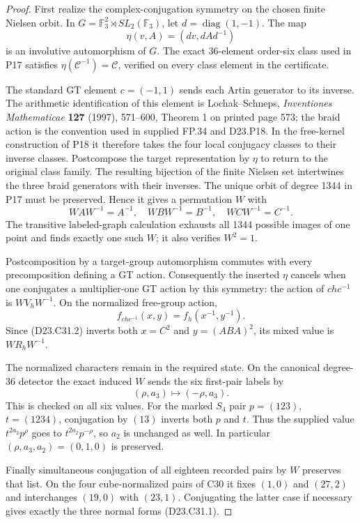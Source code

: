 \begin{proof}
First realize the complex-conjugation symmetry on the
chosen finite Nielsen orbit.  In
$G=\mathbb F_3^2\rtimes SL_2(\mathbb F_3)$, let
$d=\operatorname{diag}(1,-1)$.  The map
\[
            \eta(v,A)=(dv,dAd^{-1})
\]
is an involutive automorphism of $G$.  The exact
36-element order-six class used in P17 satisfies
$\eta(\mathcal C^{-1})=\mathcal C$, verified on every
class element in the certificate.

The standard GT element $c=(-1,1)$ sends each Artin
generator to its inverse.  The arithmetic identification
of this element is Lochak--Schneps,
\emph{Inventiones Mathematicae} \textbf{127} (1997),
571--600, Theorem 1 on printed page 573; the braid action
is the convention used in supplied FP.34 and D23.P18.
In the free-kernel
construction of P18 it therefore takes the four local
conjugacy classes to their inverse classes.  Postcompose
the target representation by $\eta$ to return to the
original class family.  The resulting bijection of the
finite Nielsen set intertwines the three braid
generators with their inverses.  The unique orbit of
degree 1344 in P17 must be preserved.  Hence it gives
a permutation $W$ with
\[
           WAW^{-1}=A^{-1},\quad WBW^{-1}=B^{-1},
           \quad WCW^{-1}=C^{-1}.                         \tag{D23.C31.2}
\]
The transitive labeled-graph calculation exhausts all
1344 possible images of one point and finds exactly
one such $W$; it also verifies $W^2=1$.

Postcomposition by a target-group automorphism commutes
with every precomposition defining a GT action.
Consequently the inserted $\eta$ cancels when one
conjugates a multiplier-one GT action by this symmetry:
the action of $chc^{-1}$ is $WV_hW^{-1}$.
On the normalized free-group action,
\[
              f_{chc^{-1}}(x,y)=f_h(x^{-1},y^{-1}).
\]
Since (D23.C31.2) inverts both $x=C^2$ and
$y=(ABA)^2$, its mixed value is $WR_hW^{-1}$.

The normalized characters remain in the required state.
On the canonical degree-36 detector the exact induced
$W$ sends the six first-pair labels by
\[
                       (\rho,a_3)\longmapsto(-\rho,a_3).
\]
This is checked on all six values.  For the marked
$S_4$ pair $p=(123)$, $t=(1234)$, conjugation by $(13)$
inverts both $p$ and $t$.  Thus the supplied value
$t^{2a_2}p^\rho$ goes to $t^{2a_2}p^{-\rho}$, so $a_2$
is unchanged as well.  In particular
$(\rho,a_3,a_2)=(0,1,0)$ is preserved.

Finally simultaneous conjugation of all eighteen
recorded pairs by $W$ preserves that list.  On the four
cube-normalized pairs of C30 it fixes $(1,0)$ and
$(27,2)$ and interchanges $(19,0)$ with $(23,1)$.
Conjugating the latter case if necessary gives exactly
the three normal forms (D23.C31.1).
\end{proof}

